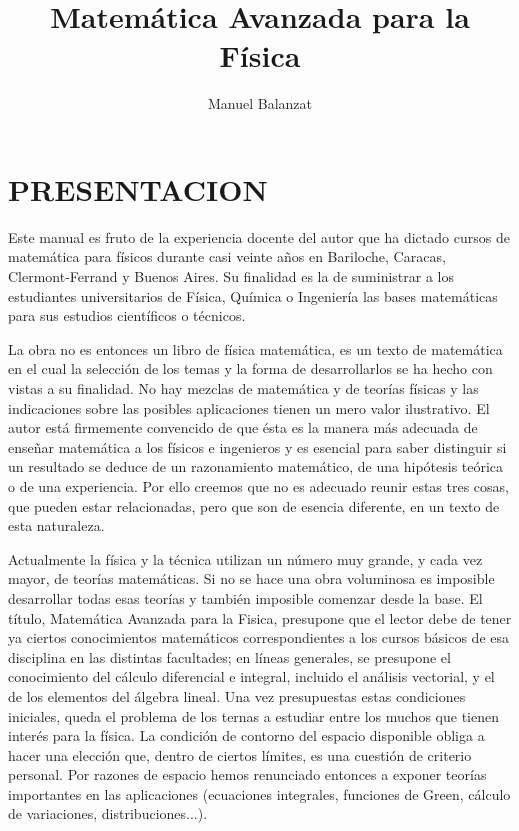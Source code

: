 \documentclass[10pt]{article}
\title{Matemática Avanzada para la Física\vspace{1.5cm}}
\author{Manuel Balanzat\vspace{1cm}}
\date{}
\theoremstyle{plain}
\theoremstyle{definition}
\theoremstyle{remark}
\begin{document}
\maketitle

\section*{PRESENTACION}
Este manual es fruto de la experiencia docente del autor que ha dictado cursos de matemática para físicos durante casi veinte años en Bariloche, Caracas, Clermont-Ferrand y Buenos Aires. Su finalidad es la de suministrar a los estudiantes universitarios de Física, Química o Ingeniería las bases matemáticas para sus estudios científicos o técnicos.

La obra no es entonces un libro de física matemática, es un texto de matemática en el cual la selección de los temas y la forma de desarrollarlos se ha hecho con vistas a su finalidad. No hay mezclas de matemática y de teorías físicas y las indicaciones sobre las posibles aplicaciones tienen un mero valor ilustrativo. El autor está firmemente convencido de que ésta es la manera más adecuada de enseñar matemática a los físicos e ingenieros y es esencial para saber distinguir si un resultado se deduce de un razonamiento matemático, de una hipótesis teórica o de una experiencia. Por ello creemos que no es adecuado reunir estas tres cosas, que pueden estar relacionadas, pero que son de esencia diferente, en un texto de esta naturaleza.

Actualmente la física y la técnica utilizan un número muy grande, y cada vez mayor, de teorías matemáticas. Si no se hace una obra voluminosa es imposible desarrollar todas esas teorías y también imposible comenzar desde la base. El título, Matemática Avanzada para la Fisica, presupone que el lector debe de tener ya ciertos conocimientos matemáticos correspondientes a los cursos básicos de esa disciplina en las distintas facultades; en líneas generales, se presupone el conocimiento del cálculo diferencial e integral, incluido el análisis vectorial, y el de los elementos del álgebra lineal. Una vez presupuestas estas condiciones iniciales, queda el problema de los ternas a estudiar entre los muchos que tienen interés para la física. La condición de contorno del espacio disponible obliga a hacer una elección que, dentro de ciertos límites, es una cuestión de criterio personal. Por razones de espacio hemos renunciado entonces a exponer teorías importantes en las aplicaciones (ecuaciones integrales, funciones de Green, cálculo de variaciones, distribuciones...).
\end{document}
